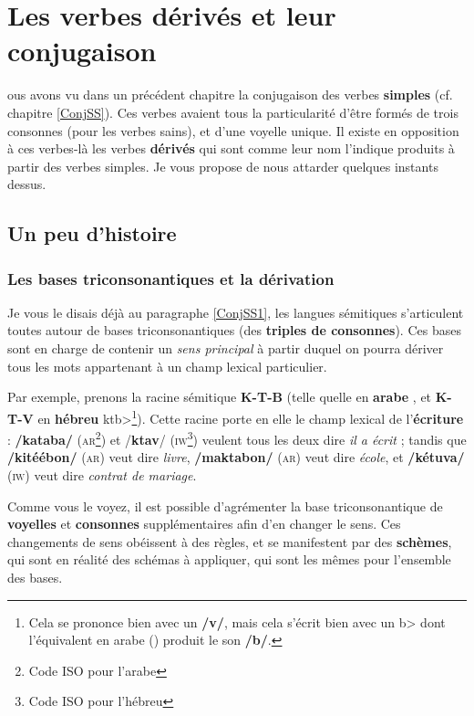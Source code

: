 \chapter{Les verbes dérivés et leur conjugaison}
ous avons vu dans un précédent chapitre la conjugaison des verbes \textbf{simples} (cf. chapitre \ref{ConjSS}). Ces verbes avaient tous la particularité d'être formés de trois consonnes (pour les verbes sains), et d'une voyelle unique. Il existe en opposition à ces verbes-là les verbes \textbf{dérivés} qui sont comme leur nom l'indique produits à partir des verbes simples. Je vous propose de nous attarder quelques instants dessus.

\section{Un peu d'histoire}
\subsection{Les bases triconsonantiques et la dérivation}
Je vous le disais déjà au paragraphe \ref{ConjSS1}, les langues sémitiques s'articulent toutes autour de bases triconsonantiques (des \textbf{triples de consonnes}). Ces bases sont en charge de contenir un \textit{sens principal} à partir duquel on pourra dériver tous les mots appartenant à un champ lexical particulier. 

Par exemple, prenons la racine sémitique \textbf{K-T-B} (telle quelle en \textbf{arabe} , et \textbf{K-T-V} en \textbf{hébreu} \<ktb>\footnote{Cela se prononce bien avec un \textbf{/v/}, mais cela s'écrit bien avec un \<b> dont l'équivalent en arabe () produit le son \textbf{/b/}.}). Cette racine porte en elle le champ lexical de l'\textbf{écriture} : \textbf{/kataba/} (\textsc{ar}\footnote{Code ISO pour l'arabe}) et /\textbf{ktav}/ (\textsc{iw}\footnote{Code ISO pour l'hébreu}) veulent tous les deux dire \textit{il a écrit} ; tandis que \textbf{/kitéébon/} (\textsc{ar}) veut dire \textit{livre}, \textbf{/maktabon/} (\textsc{ar}) veut dire \textit{école}, et \textbf{/kétuva/} (\textsc{iw}) veut dire \textit{contrat de mariage}.

Comme vous le voyez, il est possible d'agrémenter la base triconsonantique de \textbf{voyelles} et \textbf{consonnes} supplémentaires afin d'en changer le sens. Ces changements de sens obéissent à des règles, et se manifestent par des \textbf{schèmes}, qui sont en réalité des schémas à appliquer, qui sont les mêmes pour l'ensemble des bases. 

